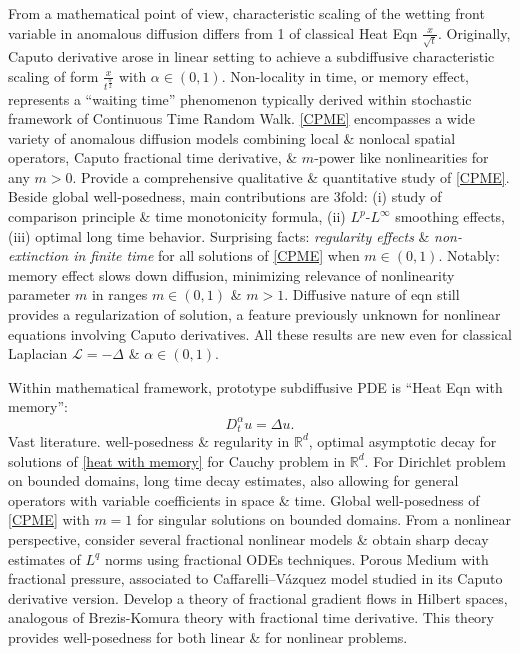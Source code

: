\documentclass{article}
\begin{document}
\begin{enumerate}
\begin{itemize}
		From a mathematical point of view, characteristic scaling of the wetting front variable in anomalous diffusion differs from 1 of classical Heat Eqn $\frac{x}{\sqrt{t}}$. Originally, Caputo derivative arose in linear setting to achieve a subdiffusive characteristic scaling of form $\frac{x}{t^{\frac{\alpha}{2}}}$ with $\alpha\in(0,1)$. Non-locality in time, or memory effect, represents a ``waiting time'' phenomenon typically derived within stochastic framework of Continuous Time Random Walk. \eqref{CPME} encompasses a wide variety of anomalous diffusion models combining local \& nonlocal spatial operators, Caputo fractional time derivative, \& $m$-power like nonlinearities for any $m > 0$. Provide a comprehensive qualitative \& quantitative study of \eqref{CPME}. Beside global well-posedness, main contributions are 3fold: (i) study of comparison principle \& time monotonicity formula, (ii) $L^p$-$L^\infty$ smoothing effects, (iii) optimal long time behavior. {\sf Surprising facts}: {\it regularity effects} \& {\it non-extinction in finite time} for all solutions of \eqref{CPME} when $m\in(0,1)$. Notably: memory effect slows down diffusion, minimizing relevance of nonlinearity parameter $m$ in ranges $m\in(0,1)$ \& $m > 1$. Diffusive nature of eqn still provides a regularization of solution, a feature previously unknown for nonlinear equations involving Caputo derivatives. All these results are new even for classical Laplacian $\mathcal{L} = -\Delta$ \& $\alpha\in(0,1)$.
		
		Within mathematical framework, prototype subdiffusive PDE is ``Heat Eqn with memory'':
		\begin{equation}
			\label{heat with memory}
			D_t^\alpha u = \Delta u.
		\end{equation}
		{\sf Vast literature.} well-posedness \& regularity in $\mathbb{R}^d$, optimal asymptotic decay for solutions of \eqref{heat with memory} for Cauchy problem in $\mathbb{R}^d$. For Dirichlet problem on bounded domains, long time decay estimates, also allowing for general operators with variable coefficients in space \& time. Global well-posedness of \eqref{CPME} with $m = 1$ for singular solutions on bounded domains. From a nonlinear perspective, consider several fractional nonlinear models \& obtain sharp decay estimates of $L^q$ norms using fractional ODEs techniques. Porous Medium with fractional pressure, associated to Caﬀarelli--Vázquez model studied in its Caputo derivative version. Develop a theory of fractional gradient flows in Hilbert spaces, analogous of Brezis-Komura theory with fractional time derivative. This theory provides well-posedness for both linear \& for nonlinear problems.
		

\end{itemize}
\end{enumerate}
\end{document}
